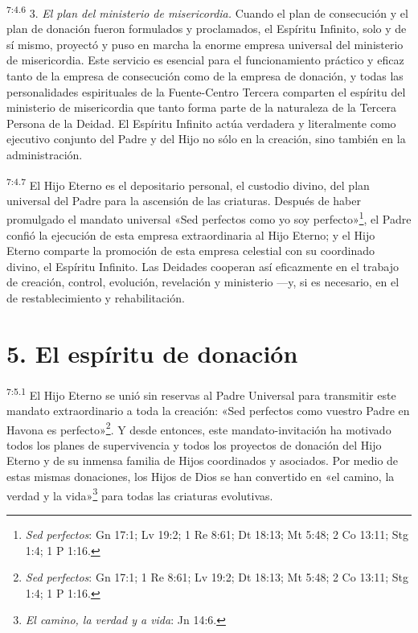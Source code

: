 \par
\textsuperscript{7:4.6} 3. \textit{El plan del ministerio de misericordia.} Cuando el plan de consecución y el plan de donación fueron formulados y proclamados, el Espíritu Infinito, solo y de sí mismo, proyectó y puso en marcha la enorme empresa universal del ministerio de misericordia. Este servicio es esencial para el funcionamiento práctico y eficaz tanto de la empresa de consecución como de la empresa de donación, y todas las personalidades espirituales de la Fuente-Centro Tercera comparten el espíritu del ministerio de misericordia que tanto forma parte de la naturaleza de la Tercera Persona de la Deidad. El Espíritu Infinito actúa verdadera y literalmente como ejecutivo conjunto del Padre y del Hijo no sólo en la creación, sino también en la administración.

\par
\textsuperscript{7:4.7} El Hijo Eterno es el depositario personal, el custodio divino, del plan universal del Padre para la ascensión de las criaturas. Después de haber promulgado el mandato universal «Sed perfectos como yo soy perfecto»\footnote{\textit{Sed perfectos}: Gn 17:1; Lv 19:2; 1 Re 8:61; Dt 18:13; Mt 5:48; 2 Co 13:11; Stg 1:4; 1 P 1:16.}, el Padre confió la ejecución de esta empresa extraordinaria al Hijo Eterno; y el Hijo Eterno comparte la promoción de esta empresa celestial con su coordinado divino, el Espíritu Infinito. Las Deidades cooperan así eficazmente en el trabajo de creación, control, evolución, revelación y ministerio ---y, si es necesario, en el de restablecimiento y rehabilitación.

\section*{5. El espíritu de donación}
\par
\textsuperscript{7:5.1} El Hijo Eterno se unió sin reservas al Padre Universal para transmitir este mandato extraordinario a toda la creación: «Sed perfectos como vuestro Padre en Havona es perfecto»\footnote{\textit{Sed perfectos}: Gn 17:1; 1 Re 8:61; Lv 19:2; Dt 18:13; Mt 5:48; 2 Co 13:11; Stg 1:4; 1 P 1:16.}. Y desde entonces, este mandato-invitación ha motivado todos los planes de supervivencia y todos los proyectos de donación del Hijo Eterno y de su inmensa familia de Hijos coordinados y asociados. Por medio de estas mismas donaciones, los Hijos de Dios se han convertido en «el camino, la verdad y la vida»\footnote{\textit{El camino, la verdad y a vida}: Jn 14:6.} para todas las criaturas evolutivas.

